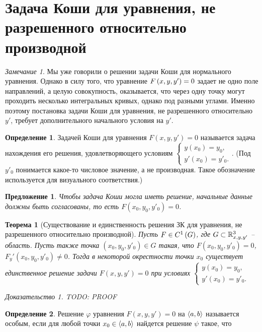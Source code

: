 \documentclass[a5paper, 10pt]{article}
\theoremstyle{definition}
\newtheorem{Def}{Определение}
\theoremstyle{plain}
\newtheorem{Th}{Теорема}
\newtheorem*{Prop}{Предложение}
\theoremstyle{remark}
\newtheorem*{Note}{Замечание}
\newtheorem*{Proof}{Доказательство}
\begin{document}
	\section[Задача Коши]{Задача Коши для уравнения, не разрешенного относительно производной}
	\begin{Note}
		Мы уже говорили о решении задачи Коши для нормального уравнения. Однако в силу того, что уравнение $F\left(x,y,y'\right) = 0$ задает не одно поле направлений, а целую совокупность, оказывается, что через одну точку могут проходить несколько интегральных кривых, однако под разными углами. Именно поэтому постановка задачи Коши для уравнения, не разрешенного относительно $y'$, требует дополнительного начального условия на $y'$.
	\end{Note}
	\begin{Def}
		Задачей Коши для уравнения $F(x,y,y') = 0$ называется задача нахождения его решения, удовлетворяющего условиям $\begin{cases}
			y(x_0) = y_0,\\
			y'(x_0) = y'_0.
		\end{cases}
	$. (Под $y'_0$ понимается какое-то числовое значение, а не производная. Такое обозначение используется для визуального соответствия.) 
	\end{Def}
	\begin{Prop}
		Чтобы задача Коши могла иметь решение, начальные данные должны быть согласованы, то есть $F(x_0, y_0, y'_0) = 0$.
	\end{Prop}
	\begin{Th}[Существование и единственность решения ЗК для уравнения, не разрешенного относительно производной]
		Пусть $F \in C^1\left(G\right)$, где $G \subset \mathbb{R}^3_{x,y,y'}$ -- область. Пусть также точка $(x_0, y_0, y'_0) \in G$ такая, что $F(x_0,y_0, y'_0) =0$, $F_y'(x_0, y_0, y'_0) \neq 0$. Тогда в некоторой окрестности точки $x_0$ существует единственное решение задачи $F(x,y,y') = 0$ при условиях $\begin{cases}
			y(x_0) = y_0,\\
			y'(x_0) = y'_0.
		\end{cases}$
		\begin{Proof}
			TODO: PROOF
		\end{Proof}
	\end{Th}

	\begin{Def}
		Решение $\varphi$ уравнения $F(x, y,y') = 0$ на $\left\langle a,b\right\rangle$ называется особым, если для любой точки $x_0 \in \left\langle a,b\right\rangle$ найдется решение $\psi$ такое, что 
	\end{Def}
	
\end{document}
